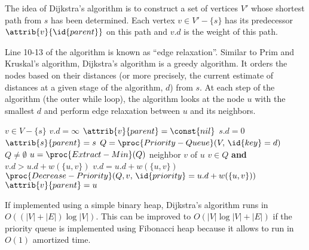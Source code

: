 The idea of Dijkstra's algorithm is to construct a set of vertices $V'$ whose shortest path from $s$ has been determined. Each vertex $v \in V' - \{s\}$ has its predecessor $\attrib{v}{\id{parent}}$ on this path and $v.d$ is the weight of this path.

Line 10-13 of the algorithm is known as ``edge relaxation''. Similar to Prim and Kruskal's algorithm, Dijkstra's algorithm is a greedy algorithm.  It orders the nodes based on their distances (or more precisely, the current estimate of distances at a given stage of the algorithm, $d$) from $s$. At each step of the algorithm (the outer while loop), the algorithm looks at the node $u$ with the smallest $d$ and perform edge relaxation between $u$ and its neighbors.

\begin{codebox}
    \li \For $v \in V - \{s\}$ \Do
        \li $v.d = \infty$
        \li $\attrib{v}{parent} = \const{nil}$
        \End
    \li $s.d = 0$
    \li $\attrib{s}{parent} = s$
    \li $Q = \proc{Priority-Queue}(V,\, \id{key}=d)$
    \li \While $Q \neq \emptyset$ \Do
        \li $u = \proc{Extract-Min}(Q)$
        \li \For neighbor $v$ of $u$ \Do
            \li \If $v \in Q$ \textbf{and} $v.d > u.d + w(\{u,v\})$ \Then
                \li $v.d = u.d + w(\{u,v\})$
                \li $\proc{Decrease-Priority}(Q,v,\, \id{priority}=u.d+w(\{u,v\}))$
                \li $\attrib{v}{parent} = u$   
\end{codebox}

If implemented using a simple binary heap, Dijkstra's algorithm runs in $O((|V|+|E|)\log|V|)$. This can be improved to $O(|V|\log |V| + |E|)$ if the priority queue is implemented using Fibonacci heap because it allows  to run in $O(1)$ amortized time.